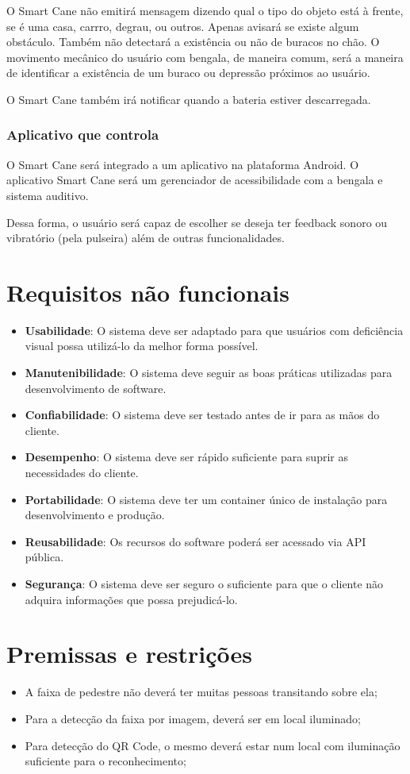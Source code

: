 O Smart Cane não emitirá mensagem dizendo qual o tipo do objeto está à frente, se é uma casa, carrro, degrau, ou outros. Apenas avisará se existe algum obstáculo. Também não detectará a existência ou não de buracos no chão. O movimento mecânico do usuário com  bengala, de maneira comum, será a maneira de identificar a existência de um buraco ou depressão próximos ao usuário.

O Smart Cane também irá notificar quando a bateria estiver descarregada.

\subsubsection{Aplicativo que controla}

O Smart Cane será integrado a um aplicativo na plataforma Android. O aplicativo Smart Cane será um gerenciador de acessibilidade com a bengala e sistema auditivo.

Dessa forma, o usuário será capaz de escolher se deseja ter feedback sonoro ou vibratório (pela pulseira) além de outras funcionalidades.

\section{Requisitos não funcionais}

\begin{itemize}
    \item \textbf{Usabilidade}: O sistema deve ser adaptado para que usuários com deficiência visual possa utilizá-lo da melhor forma possível.
    \item \textbf{Manutenibilidade}: O sistema deve seguir as boas práticas utilizadas para desenvolvimento de software.
    \item \textbf{Confiabilidade}: O sistema deve ser testado antes de ir para as mãos do cliente.
    \item \textbf{Desempenho}: O sistema deve ser rápido suficiente para suprir as necessidades do cliente.
    \item \textbf{Portabilidade}: O sistema deve ter um container único de instalação para desenvolvimento e produção.
    \item \textbf{Reusabilidade}: Os recursos do software poderá ser acessado via API pública.
    \item \textbf{Segurança}: O sistema deve ser seguro o suficiente para que o cliente não adquira informações que possa prejudicá-lo.
\end{itemize}

\section{Premissas e restrições}

\begin{itemize}
    \item A faixa de pedestre não deverá ter muitas pessoas transitando sobre ela;
    \item Para a detecção da faixa por imagem, deverá ser em local iluminado;
    \item Para detecção do QR Code, o mesmo deverá estar num local com iluminação suficiente para o reconhecimento;
\end{itemize}